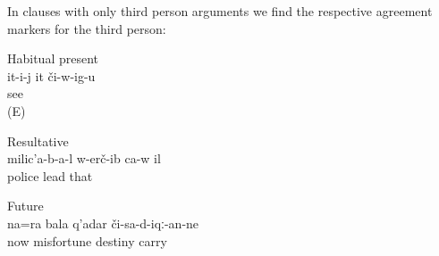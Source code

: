 In clauses with only third person arguments we find the respective agreement markers for the third person:
%
\begin{exe}
		\ex	Habitual present\\	\label{ex:S/he sees him habitual present}
		\gll	it-i-j	it	či-w-ig-u\\
					see\\
		\glt	{} (E)

		\ex	Resultative\\		\label{ex:The police took him resultative}
		\gll	milic'a-b-a-l	w-erč-ib	ca-w	il\\
			police	lead		that\\
		\glt	{}

		\ex	Future\\		\label{ex:Now he will also bring trouble future}
		\gll	na=ra	bala	q'adar	či-sa-d-iqː-an-ne\\
			now	misfortune	destiny	carry\\
		\glt	{}
\end{exe}

